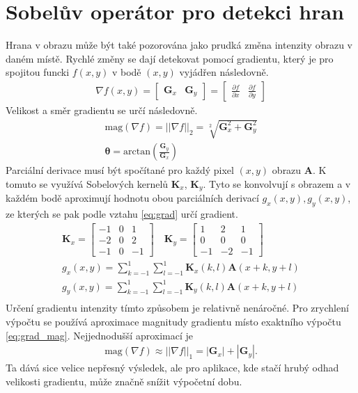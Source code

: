 \documentclass[twoside]{ctuthesis}
\newcommand{\tl}[1]{$\mathbf{#1}$}
\begin{document}
\section{Sobelův operátor pro detekci hran}
\label{subsec:sobel}
Hrana v obrazu může být také pozorována jako prudká změna intenzity obrazu v daném místě. Rychlé změny se dají detekovat pomocí gradientu, který je pro spojitou funcki $f(x,y)$ v bodě $(x,y)$ vyjádřen následovně. 
\begin{align}
    \nabla f(x,y) =  \begin{bmatrix} \mathbf{G}_x & \mathbf{G}_y \end{bmatrix} = \begin{bmatrix} \frac{\partial f}{\partial x} & \frac{\partial f}{\partial y} \end{bmatrix} \label{eq:grad}
\end{align}
Velikost a směr gradientu se určí následovně.
\begin{align}
    \text{mag}(\nabla f) = ||\nabla f ||_2 = \sqrt[2]{\mathbf{G}_x ^2 + \mathbf{G}_y ^2} \label{eq:grad_mag} \\
    \boldsymbol{\theta} = \text{arctan} (\frac{\mathbf{G}_y}{\mathbf{G}_x})
\end{align}
Parciální derivace musí být spočítané pro každý pixel $(x,y)$ obrazu \tl{A}. K tomuto se využívá Sobelových kernelů $\mathbf{K}_x$, $\mathbf{K}_y$. Tyto se konvolvují s obrazem a v každém bodě aproximují hodnotu obou parciálních derivací $g_x(x,y), g_y(x,y)$, ze kterých se pak podle vztahu \ref{eq:grad} určí gradient.
\begin{align}
    \mathbf{K}_x = \begin{bmatrix} -1 & 0 & 1 \\ -2 & 0 &2 \\ -1 & 0 & -1 \end{bmatrix} \quad \mathbf{K}_y = \begin{bmatrix} 1 & 2 & 1 \\ 0 & 0 & 0 \\ -1 & -2 & -1 \end{bmatrix} \\
    g_x(x,y) = \sum_{k = -1}^1 \sum_{l = -1}^1 \mathbf{K}_x(k,l)\mathbf{A}(x+k, y+l) \\
    g_y(x,y) = \sum_{k = -1}^1 \sum_{l = -1}^1 \mathbf{K}_y(k,l)\mathbf{A}(x+k, y+l) \\
\end{align}
Určení gradientu intenzity tímto způsobem je relativně nenáročné. Pro zrychlení výpočtu se používá aproximace magnitudy gradientu místo exaktního výpočtu \ref{eq:grad_mag}. Nejjednodušší aproximací je 
\begin{align}
    \text{mag}(\nabla f) \approx ||\nabla f ||_1 = |\mathbf{G}_x| + |\mathbf{G}_y|.  
\end{align}
Ta dává sice velice nepřesný výsledek, ale pro aplikace, kde stačí hrubý odhad velikosti gradientu, může značně snížit výpočetní dobu.
\end{document}
